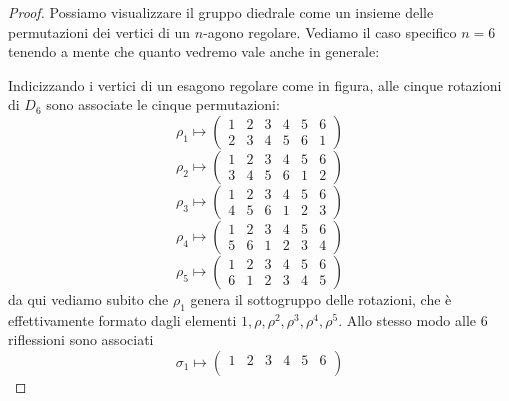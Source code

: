 \documentclass[11pt]{scrartcl}
\begin{document}
	\begin{proof}
		Possiamo visualizzare il gruppo diedrale come un insieme delle permutazioni dei vertici di un $n$-agono regolare. Vediamo il caso specifico $n=6$ tenendo a mente che quanto vedremo vale anche in generale:
		\begin{center}
		\end{center}
		Indicizzando i vertici di un esagono regolare come in figura, alle cinque rotazioni di $D_6$ sono associate le cinque permutazioni:
		$$\rho_1 \mapsto 
		\begin{pmatrix}
			1 & 2 & 3 & 4 & 5 & 6 \\
			2 & 3 & 4 & 5 & 6 & 1
		\end{pmatrix}
		$$
		$$\rho_2 \mapsto 
		\begin{pmatrix}
			1 & 2 & 3 & 4 & 5 & 6 \\
			3 & 4 & 5 & 6 & 1 & 2
		\end{pmatrix}
		$$
		$$\rho_3 \mapsto 
		\begin{pmatrix}
			1 & 2 & 3 & 4 & 5 & 6 \\
			4 & 5 & 6 & 1 & 2 & 3
		\end{pmatrix}
		$$
		$$\rho_4 \mapsto 
		\begin{pmatrix}
			1 & 2 & 3 & 4 & 5 & 6 \\
			5 & 6 & 1 & 2 & 3 & 4
		\end{pmatrix}
		$$
		$$\rho_5 \mapsto 
		\begin{pmatrix}
			1 & 2 & 3 & 4 & 5 & 6 \\
			6 & 1 & 2 & 3 & 4 & 5
		\end{pmatrix}
		$$
		da qui vediamo subito che $\rho_1$ genera il sottogruppo delle rotazioni, che è effettivamente formato dagli elementi $1,\rho,\rho^2,\rho^3,\rho^4,\rho^5$. Allo stesso modo alle $6$ riflessioni sono associati 
		$$\sigma_1 \mapsto 
		\begin{pmatrix}
			1 & 2 & 3 & 4 & 5 & 6 \\

\end{pmatrix}$$
\end{proof}
\end{document}
